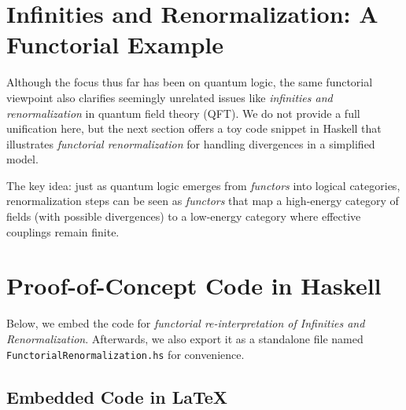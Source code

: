 \documentclass[12pt]{article}
\begin{document}
\section{Infinities and Renormalization: A Functorial Example}
\label{sec:RenormIntro}
Although the focus thus far has been on quantum logic, the same functorial viewpoint also clarifies seemingly unrelated issues like \emph{infinities and renormalization} in quantum field theory (QFT). We do not provide a full unification here, but the next section offers a toy code snippet in Haskell that illustrates \emph{functorial renormalization} for handling divergences in a simplified model.

The key idea: just as quantum logic emerges from \emph{functors} into logical categories, renormalization steps can be seen as \emph{functors} that map a high-energy category of fields (with possible divergences) to a low-energy category where effective couplings remain finite.

\section{Proof-of-Concept Code in Haskell}
\label{sec:HaskellCode}
Below, we embed the code for \emph{functorial re-interpretation of Infinities and Renormalization}. 
Afterwards, we also export it as a standalone file named \texttt{FunctorialRenormalization.hs} for convenience.

\subsection{Embedded Code in \LaTeX}
\end{document}
